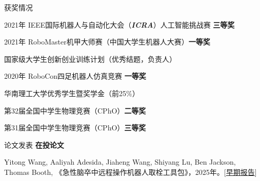 \documentclass{resume} %
\begin{document}

\begin{rSection}{获奖情况} \itemsep -5pt
\item 2021年 IEEE国际机器人与自动化大会（{\bf\em ICRA}）人工智能挑战赛 {\bf 三等奖}
\item 2021年 RoboMaster机甲大师赛（中国大学生机器人大赛）{\bf 一等奖}
\item 国家级大学生创新创业训练计划（优秀结题，负责人）
\item 2020年 RoboCon四足机器人仿真竞赛 {\bf 一等奖}
\item 华南理工大学优秀学生暨奖学金（前25\%）
\item 第32届全国中学生物理竞赛（CPhO）{\bf 二等奖}
\item 第31届全国中学生物理竞赛（CPhO）{\bf 三等奖}

\end{rSection}


\begin{rSection}{论文发表} \itemsep -5pt
{\bf 在投论文}
\item Yitong Wang, Aaliyah Adesida, Jiaheng Wang, Shiyang Lu, Ben Jackson, Thomas Booth, 《急性脑卒中远程操作机器人取栓工具包》，2025年。[\href{https://docs.google.com/document/d/1d-0TzQVWwxyS-562f4fhBHqsg136TUnLxxGucI2UqpA/edit#heading=h.8kry2pqa1z3y}{早期报告}]

\end{rSection}

\end{document}
